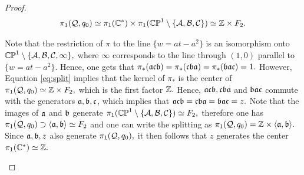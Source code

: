 \documentclass{article}
\begin{document}
\begin{proof}
\begin{equation}\label{eq:split}
\pi_1(\mathcal{Q},q_0)\simeq \pi_1(\mathbb{C}^*)\times\pi_1(\mathbb{CP}^1\setminus \{\mathcal{A},\mathcal{B},\mathcal{C}\})\simeq  \mathbb{Z}\times F_2.
\end{equation}

Note that the restriction of $\pi$ to the line $\{w=at-a^2\}$ is an isomorphism onto $\mathbb{CP}^1\setminus \{\mathcal{A},\mathcal{B},\mathcal{C},\infty\},$ where $\infty$ corresponds to the line through $(1,0)$ parallel to $\{w=at-a^2\}.$ Hence, one gets that $\pi_*(\mathfrak{a}\mathfrak{c}\mathfrak{b})=\pi_*(\mathfrak{c}\mathfrak{b}\mathfrak{a})=\pi_*(\mathfrak{b}\mathfrak{a}\mathfrak{c})=1.$ However, Equation \ref{eq:split} implies that the kernel of $\pi_*$ is the center of $\pi_1(\mathcal{Q},q_0)\simeq \mathbb{Z}\times F_2,$ which is the first factor $\mathbb{Z}.$ Hence, $\mathfrak{a}\mathfrak{c}\mathfrak{b},\mathfrak{c}\mathfrak{b}\mathfrak{a}$ and $\mathfrak{b}\mathfrak{a}\mathfrak{c}$ commute with the generators $\mathfrak{a},\mathfrak{b},\mathfrak{c}$, which implies that $\mathfrak{a}\mathfrak{c}\mathfrak{b}=\mathfrak{c}\mathfrak{b}\mathfrak{a}=\mathfrak{b}\mathfrak{a}\mathfrak{c}=z.$ Note that the images of $\mathfrak{a}$ and $\mathfrak{b}$ generate $\pi_1(\mathbb{CP}^1\setminus \{\mathcal{A},\mathcal{B},\mathcal{C}\})\simeq F_2,$ therefore one has $\pi_1(\mathcal{Q},q_0)\supset\langle \mathfrak{a},\mathfrak{b}\rangle\simeq F_2$ and one can write the splitting as $\pi_1(\mathcal{Q},q_0)=\mathbb{Z}\times\langle \mathfrak{a},\mathfrak{b}\rangle.$ Since $\mathfrak{a},\mathfrak{b},z$ also generate $\pi_1(\mathcal{Q},q_0),$ it then follows that $z$ generates the center $\pi_1(\mathbb{C}^*)\simeq\mathbb{Z}.$


\begin{figure}
\begin{center}
\end{center}
\end{figure}
\end{proof}
\end{document}
